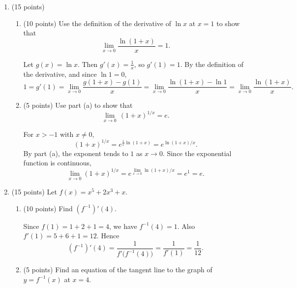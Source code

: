 \documentclass[12pt,letterpaper]{article}
\newcommand{\points}[1]{(#1 points)}
\begin{document}
\vfill
\newpage

\begin{enumerate}[label=\textbf{\arabic*.},leftmargin=2em]
  \item \points{15}
    \begin{enumerate}[label=(\alph*)]
      \item \points{10} Use the definition of the derivative of $\ln x$ at
        $x=1$ to show that
        \[
          \lim_{x\to 0}\frac{\ln(1+x)}{x}=1.
        \]

        \begin{solution}
          Let $g(x)=\ln x$. Then $g'(x)=\frac1x$, so $g'(1)=1$. By the
          definition of the derivative, and since $\ln 1=0$,
          \[
            1=g'(1)=\lim_{x\to0}\frac{g(1+x)-g(1)}{x}
             =\lim_{x\to0}\frac{\ln(1+x)-\ln 1}{x}
             =\lim_{x\to0}\frac{\ln(1+x)}{x}.
          \]
        \end{solution}
        \vfill

      \item \points{5} Use part (a) to show that
        \[
          \lim_{x\to 0}\,(1+x)^{1/x}=e.
        \]

        \begin{solution}
          For $x>-1$ with $x\neq0$,
          \[
            (1+x)^{1/x}=e^{\frac1x\ln(1+x)}=e^{\ln(1+x)/x}.
          \]
          By part (a), the exponent tends to $1$ as $x\to0$. Since the
          exponential function is continuous,
          \[
            \lim_{x\to0}(1+x)^{1/x}
            =e^{\lim_{x\to0}\ln(1+x)/x}=e^1=e.
          \]
        \end{solution}
        \vfill
    \end{enumerate}
    \newpage

  \item \points{15}
    Let $f(x)=x^5+2x^3+x$.
    \begin{enumerate}[label=(\alph*)]
      \item \points{10} Find $(f^{-1})'(4)$.

        \begin{solution}
          Since $f(1)=1+2+1=4$, we have $f^{-1}(4)=1$. Also
          $f'(1)=5+6+1=12$. Hence
          \[
            (f^{-1})'(4)=\frac{1}{f'\bigl(f^{-1}(4)\bigr)}
              =\frac{1}{f'(1)}=\frac{1}{12}.
          \]
        \end{solution}
        \vfill

      \item \points{5} Find an equation of the tangent line to the graph of
        $y=f^{-1}(x)$ at $x=4$.


\end{enumerate}
\end{enumerate}
\end{document}
